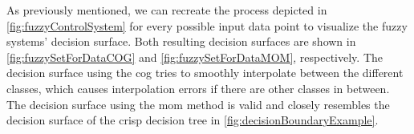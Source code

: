 As previously mentioned, we can recreate the process depicted in \autoref{fig:fuzzyControlSystem} for every possible input data point to visualize the fuzzy systems' decision surface. Both resulting decision surfaces are shown in \autoref{fig:fuzzySetForDataCOG} and \autoref{fig:fuzzySetForDataMOM}, respectively. The decision surface using the \gls{cog} tries to smoothly interpolate between the different classes, which causes interpolation errors if there are other classes in between. The decision surface using the \gls{mom} method is valid and closely resembles the decision surface of the crisp decision tree in \autoref{fig:decisionBoundaryExample}.

\begin{multicols}{2}
    \begin{figure}[H]
        \centering


\end{figure}
\end{multicols}
